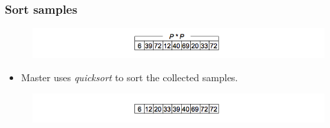 \documentclass{beamer}
\begin{document}
\begin{frame}
	\frametitle{Sort samples}
	\begin{figure}
		\begin{center}
			\includegraphics[width=\textwidth]{images/03sampling2.png}
		\end{center}
	\end{figure}
	
	\pause
	\begin{itemize}
		\item{Master uses \textit{quicksort} to sort the collected samples.}
	\end{itemize}
	
	\begin{figure}
		\begin{center}
			\includegraphics[width=\textwidth]{images/04samporder.png}
		\end{center}
	\end{figure}
\end{frame}
\end{document}
